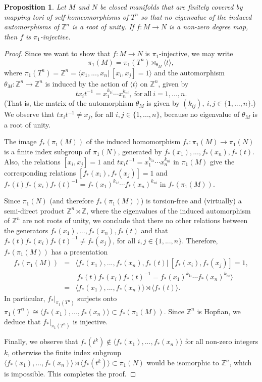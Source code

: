 \documentclass[12pt]{amsart}
\newtheorem{prop}[thm]{Proposition}
\theoremstyle{remark}
\begin{document}
\begin{prop}\label{p:injectivemappingtoriTn}
 Let $M$ and $N$ be closed manifolds that are finitely covered by mapping tori of self-homeomorphisms of $T^n$ so that no eigenvalue of the induced
automorphisms of ${\mathbb{Z}}^n$ is a root of unity. If $f \colon M \longrightarrow N$ is a non-zero degree map, then $f$ is $\pi_1$-injective.
\end{prop}
\begin{proof}
 Since we want to show that $f \colon M \longrightarrow N$ is $\pi_1$-injective, we may write 
 \[
 \pi_1(M) = \pi_1(T^n) \rtimes_{\theta_M} \langle t \rangle,
 \]
where $\pi_1(T^n) = {\mathbb{Z}}^n = \langle x_1,...,x_n \vert \ [x_i,x_j] = 1 \rangle$ and the automorphism $\theta_M \colon {\mathbb{Z}}^n
\longrightarrow {\mathbb{Z}}^n$ is induced by the action of $\langle t \rangle$ on ${\mathbb{Z}}^n$, given by
\[
tx_it^{-1} = x_1^{k_{1i}} \cdots x_n^{k_{ni}}, \ \mathrm{for \ all} \ i = 1,..., n.
\]
(That is, the matrix of the automorphism $\theta_M$ is given by $(k_{ij}), \ i,j \in \{1,...,n\}$.)
We observe that
$tx_it^{-1} \neq x_j$, for all
$i,j \in \{1,...,n\}$, because no eigenvalue of $\theta_M$ is a root of unity. 

The image $f_*(\pi_1(M))$ of the induced homomorphism $f_* \colon \pi_1(M) \longrightarrow \pi_1(N)$ is a finite index
subgroup of $\pi_1(N)$, 
generated by $f_*(x_1),...,f_*(x_n), f_*(t)$. Also, the relations $[x_i,x_j] = 1$ and $tx_it^{-1} = x_1^{k_{1i}} \cdots x_n^{k_{ni}}$ in $\pi_1(M)$ give
the corresponding relations $[f_*(x_i),f_*(x_j)] = 1$ and $f_*(t)f_*(x_i)f_*(t)^{-1} = f_*(x_1)^{k_{1i}} \cdots f_*(x_n)^{k_{ni}}$ in $f_*(\pi_1(M))$. 

Since $\pi_1(N)$ (and therefore $f_*(\pi_1(M))$) is torsion-free and (virtually) a semi-direct product ${\mathbb{Z}}^n \rtimes {\mathbb{Z}}$, where the eigenvalues of the
induced automorphism of ${\mathbb{Z}}^n$ are
not roots of unity, we conclude that there no other relations between the generators $f_*(x_1),...,f_*(x_n),f_*(t)$ and that $f_*(t)f_*(x_i)f_*(t)^{-1} \neq
f_*(x_j)$,
for all $i,j \in \{1,...,n\}$. Therefore, $f_*(\pi_1(M))$ has a presentation
\begin{eqnarray*}
 f_*(\pi_1(M))  & = & \langle f_*(x_1),...,f_*(x_n),f_*(t) \vert \ [f_*(x_i),f_*(x_j)] = 1,\\
                &   & \ f_*(t)f_*(x_i)f_*(t)^{-1} = f_*(x_1)^{k_{1i}} \cdots f_*(x_n)^{k_{ni}} \rangle\\
                & = & \langle f_*(x_1),...,f_*(x_n) \rangle \rtimes \langle f_*(t) \rangle.
\end{eqnarray*}
In particular, $f_*\vert_{\pi_1(T^n)}$ surjects onto $\pi_1(T^n) \cong \langle f_*(x_1),...,f_*(x_n) \rangle \subset f_*(\pi_1(M))$. Since ${\mathbb{Z}}^n$ is
Hopfian, we deduce that $f_*\vert_{\pi_1(T^n)}$ is injective. 

Finally, we observe that $f_*(t^k) \notin \langle f_*(x_1),...,f_*(x_n) \rangle$ for all non-zero integers $k$, otherwise the finite index subgroup 
$\langle f_*(x_1),...,f_*(x_n) \rangle \rtimes \langle f_*(t^k) \rangle \subset \pi_1(N)$ would be isomorphic to ${\mathbb{Z}}^n$, which is impossible. This
completes the proof. 
\end{proof}
\end{document}
